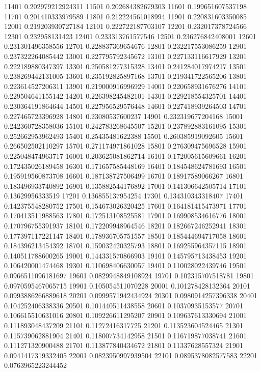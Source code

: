 {11401 0.202979212924311
11501 0.202684382679303
11601 0.199651607537198
11701 0.201410333979589
11801 0.212224561018994
11901 0.220831603350085
12001 0.219203930727184
12101 0.222722187703107
12201 0.232017378724566
12301 0.232958131423
12401 0.233313761577546
12501 0.236276842408001
12601 0.231301496358556
12701 0.228837369654676
12801 0.232217553086259
12901 0.237322264085442
13001 0.227795792345672
13101 0.227133116617929
13201 0.222189880347397
13301 0.250581277315328
13401 0.241284017974217
13501 0.238269442131005
13601 0.235192825897168
13701 0.219341722565206
13801 0.223614527206311
13901 0.219000916996929
14001 0.220658931676276
14101 0.229504641155142
14201 0.226398245482101
14301 0.229218554325701
14401 0.230364191864644
14501 0.227956529576448
14601 0.227418939264503
14701 0.227465723396928
14801 0.23080537600237
14901 0.232319677204168
15001 0.242360728358036
15101 0.242783268645507
15201 0.237892883161095
15301 0.252662953962493
15401 0.25435481622388
15501 0.260385919092605
15601 0.266502502110297
15701 0.271174971861028
15801 0.276309475696528
15901 0.225048474963717
16001 0.203625081862714
16101 0.172005615609661
16201 0.172435026189458
16301 0.171657585448169
16401 0.184548624781693
16501 0.195919560873708
16601 0.187138727506499
16701 0.18917589066267
16801 0.183496933740892
16901 0.135882544176892
17001 0.141306642505714
17101 0.13629956333519
17201 0.136855137954254
17301 0.134310343318407
17401 0.142375548280752
17501 0.154673026320425
17601 0.164181415473971
17701 0.170413511988563
17801 0.172513108525581
17901 0.169908534616776
18001 0.170796755391937
18101 0.172209948964546
18201 0.182667246252941
18301 0.177397117221147
18401 0.178936705751557
18501 0.185444694717058
18601 0.184396213454392
18701 0.159032420325793
18801 0.169255964357115
18901 0.140511788600265
19001 0.144331570866903
19101 0.145795713438453
19201 0.106420001474468
19301 0.110698406630057
19401 0.110028022439746
19501 0.0966511096181697
19601 0.0829948849108924
19701 0.102315707518781
19801 0.0970595467065715
19901 0.105054511070228
20001 0.101278428132364
20101 0.0993886266889618
20201 0.0999571942434924
20301 0.0980914257396338
20401 0.104252406338336
20501 0.101440511438558
20601 0.10370935153577
20701 0.106615510631016
20801 0.109226611295207
20901 0.109637613330694
21001 0.111893048437209
21101 0.11272416317725
21201 0.113523604524465
21301 0.115739062881904
21401 0.118007734142958
21501 0.116719877038741
21601 0.111271320900488
21701 0.113877840434672
21801 0.11337628557324
21901 0.0941417319332405
22001 0.0823950997939504
22101 0.0895378082577583
22201 0.0763965223244452
}
